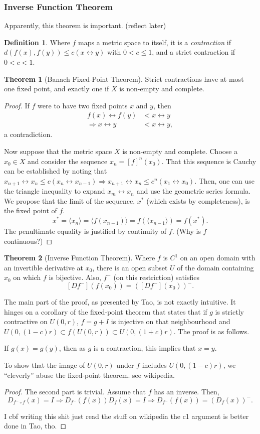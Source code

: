 \documentclass{article}
\newcommand{\lra}{\leftrightarrow}
\theoremstyle{definition}
\newtheorem{thm}{Theorem}[subsubsection]
\newtheorem{defn}{Definition}[subsubsection]
\begin{document}
\subsubsection{Inverse Function Theorem}
Apparently, this theorem is important. (reflect later)
\begin{defn}
	Where $f$ maps a metric space to itself, it is a \emph{contraction} if $d(f(x),f(y))\leq c(x\lra y)$ with $0<c\leq1$, and a strict contraction if $0<c<1$.
\end{defn}
\begin{thm}[Banach Fixed-Point Theorem]
	Strict contractions have at most one fixed point, and exactly one if $X$ is non-empty and complete.
\end{thm}
\begin{proof}
	If $f$ were to have two fixed points $x$ and $y$, then
	\begin{align*}
		f(x)\lra f(y)&<x\lra y\\
		\Rightarrow x\lra y&<x\lra y,
	\end{align*}
	a contradiction.\par
	Now suppose that the metric space $X$ is non-empty and complete. Choose a $x_0\in X$ and consider the sequence $x_n=[f]^n(x_0)$. That this sequence is Cauchy can be established by noting that $x_{n+1}\lra x_n\leq c(x_n\lra x_{n-1})\Rightarrow x_{n+1}\lra x_n\leq c^n(x_1\lra x_0)$. Then, one can use the triangle inequality to expand $x_m\lra x_n$ and use the geometric series formula. We propose that the limit of the sequence, $x^*$ (which exists by completeness), is the fixed point of $f$.
	\[x^*=\langle x_n\rangle=\langle f(x_{n-1})\rangle=f(\langle x_{n-1}\rangle)=f(x^*).\] The penultimate equality is justified by continuity of $f$. (Why is $f$ continuous?)
\end{proof}
\begin{thm}[Inverse Function Theorem]\label{ift}
	Where $f$ is $C^1$ on an open domain with an invertible derivative at $x_0$, there is an open subset $U$ of the domain containing $x_0$ on which $f$ is bijective. Also, $f^-$ (on this restriction) satisfies
	\[[Df^-](f(x_0))=([Df^-](x_0))^-.\]
\end{thm}
The main part of the proof, as presented by Tao, is not exactly intuitive. It hinges on a corollary of the fixed-point theorem that states that if $g$ is strictly contractive on $U(0,r)$, $f=g+I$ is injective on that neighbourhood and $U(0,(1-c)r)\subset f(U(0,r))\subset U(0,(1+c)r)$. The proof is as follows.\par
If $g(x)=g(y)$, then as $g$ is a contraction, this implies that $x=y$.\par
To show that the image of $U(0,r)$ under $f$ includes $U(0,(1-c)r)$, we ``cleverly'' abuse the fixed-point theorem. see wikipedia.
\begin{proof}
	The second part is trivial. Assume that $f$ has an inverse. Then, \[D_{f^-\circ f}(x)=I\Rightarrow D_{f^-}(f(x))D_f(x)=I\Rightarrow D_{f^-}(f(x))=(D_f(x))^-.\]
	
	I cbf writing this shit just read the stuff on wikipedia 
	the c1 argument is better done in Tao, tho.
\end{proof}
\end{document}
